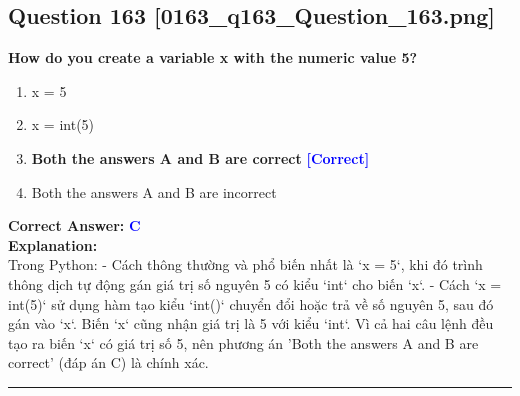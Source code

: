 \documentclass[11pt,a4paper]{article}
\begin{document}
\begin{minipage}{\textwidth}
\subsection*{Question 163 \quad \footnotesize{[0163_q163_Question_163.png]}}
\noindent \textbf{How do you create a variable x with the numeric value 5?}

\begin{enumerate}[label=\Alph*.]
    \item x = 5
    \item x = int(5)
    \item \textbf{Both the answers A and B are correct} \hfill \textcolor{blue}{\textbf{[Correct]}}
    \item Both the answers A and B are incorrect
\end{enumerate}

\noindent \textbf{Correct Answer:} \textcolor{blue}{\textbf{C}} \\[4pt]
\noindent \textbf{Explanation:}\\
Trong Python:\newline
- Cách thông thường và phổ biến nhất là `x = 5`, khi đó trình thông dịch tự động gán giá trị số nguyên 5 có kiểu `int` cho biến `x`.\newline
- Cách `x = int(5)` sử dụng hàm tạo kiểu `int()` chuyển đổi hoặc trả về số nguyên 5, sau đó gán vào `x`. Biến `x` cũng nhận giá trị là 5 với kiểu `int`.\newline
Vì cả hai câu lệnh đều tạo ra biến `x` có giá trị số 5, nên phương án 'Both the answers A and B are correct' (đáp án C) là chính xác.
\end{minipage}
\vspace{0.8cm}
\hrule
\vspace{0.5cm}
\end{document}
